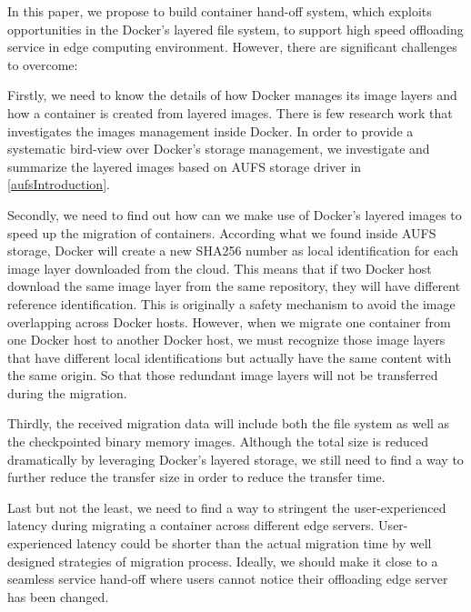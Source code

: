 In this paper, we propose to build container hand-off system, which exploits opportunities in the Docker's layered file system, to support high speed offloading service in edge computing environment. 
However, there are significant challenges to overcome:

Firstly, we need to know the details of how Docker manages its image layers and how a container is created from layered images. There is few research work that investigates the images management inside Docker. In order to provide a systematic bird-view over Docker's storage management, we investigate and summarize the layered images based on AUFS storage driver in \ref{aufsIntroduction}.

Secondly, we need to find out how can we make use of Docker's layered images to speed up the migration of containers. According what we found inside AUFS storage, Docker will create a new SHA256 number as local  identification for each image layer downloaded from the cloud. 
This means that if two Docker host download the same image layer from the same repository, they will have different reference identification. This is originally a safety mechanism to avoid the image overlapping across Docker hosts\cite{dockerlayer}. 
However, when we migrate one container from one Docker host to another Docker host, we must recognize those image layers that have different local identifications but actually have the same content with the same origin. So that those redundant image layers will not be transferred during the migration.

Thirdly, the received migration data will include both the file system as well as the checkpointed binary memory images. Although the total size is reduced dramatically by leveraging Docker's layered storage, we still need to find a way to further reduce the transfer size in order to reduce the transfer time. 

Last but not the least, we need to find a way to stringent the user-experienced latency during migrating a container across different edge servers. User-experienced latency could be shorter than the actual migration time by well designed strategies of migration process. Ideally, we should make it close to a seamless service hand-off where users cannot notice their offloading edge server has been changed.

